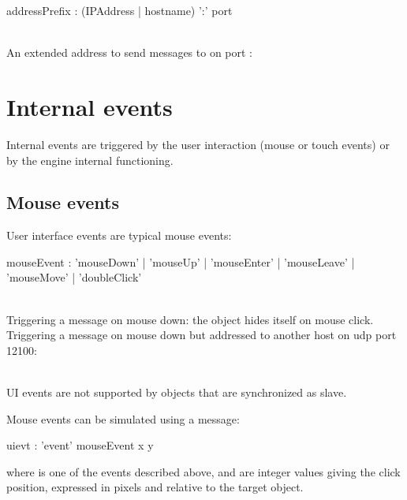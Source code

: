 \documentclass[a4paper,twoside]{report}
\newcommand{\sublevel}[1]	{\section{#1}}
\newcommand{\subsublevel}[1]	{\subsection{#1}}
\newcommand{\sampleindent}	{ \hspace{0.5cm} }
\begin{document}
\begin{rail} 
addressPrefix : (IPAddress | hostname) ':' port
\end{rail}

\example \\
An extended address to send messages to  on port :

\sublevel{Internal events}
\label{defevents}

Internal events are triggered by the user interaction (mouse or touch events) or by the engine internal functioning.

\subsublevel{Mouse events}
\label{uievents}

User interface events are typical mouse events:

	
\begin{rail}
mouseEvent : 'mouseDown' | 'mouseUp' | 'mouseEnter' | 'mouseLeave' | 'mouseMove' | 'doubleClick' 
\end{rail}

\example \\
Triggering a message on mouse down:
\sampleindent the object hides itself on mouse click. \\
Triggering a message on mouse down but addressed to another host on udp port 12100:

\note{} \\
UI events are not supported by objects that are synchronized as slave.

Mouse events can be simulated using a  message:


\begin{rail}
uievt : 'event' mouseEvent x y
\end{rail}

where  is one of the events described above,  and  are integer values giving the click position, expressed in pixels and relative to the target object.
\end{document}
